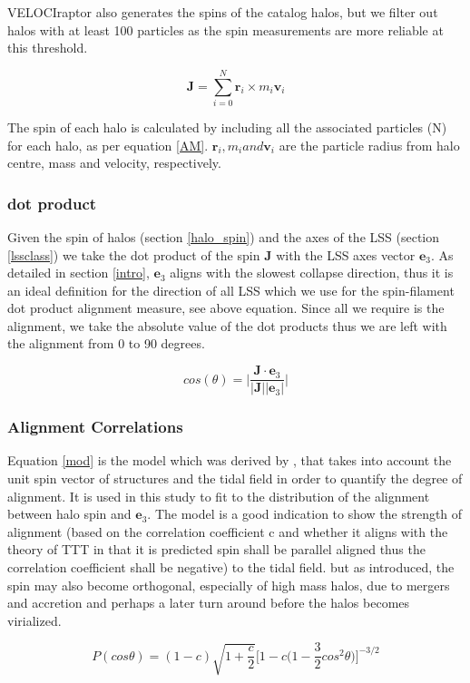 \documentclass[a4paper,fleqn,usenatbib]{mnras}
\begin{document}
VELOCIraptor also generates the spins of the catalog halos, but we filter out halos with at least 100 particles as the spin measurements are more reliable at this threshold. 
\begin{ceqn}
\begin{equation}
\textbf{J}=\sum_{i=0}^{N}\textbf{r}_i\times m_i\textbf{v}_i \label{AM}
\end{equation}
\end{ceqn}

The spin of each halo is calculated by including all the associated particles (N) for each halo, as per equation \ref{AM}. $\textbf{r}_i,m_i and \textbf{v}_i$ are the particle radius from halo centre, mass and velocity, respectively.

\subsubsection{dot product}

Given the spin of halos (section \ref{halo_spin}) and the axes of the LSS (section \ref{lssclass}) we take the dot product of the spin \textbf{J} with the LSS axes vector $\textbf{e}_{3}$. As detailed in section \ref{intro}, $\textbf{e}_{3}$ aligns with the slowest collapse direction, thus it is an ideal definition for the direction of all LSS which we use for the spin-filament dot product alignment measure, see above equation.
Since all we require is the alignment, we take the absolute value of the dot products thus we are left with the alignment from 0 to 90 degrees. 
\begin{ceqn}
\begin{equation}
cos(\theta)=\bigg|\frac{\textbf{J}\cdot \textbf{e}_{3}}{|\textbf{J}| |\textbf{e}_{3}|}\bigg|\label{dotprod}
\end{equation}
\end{ceqn}

\subsubsection{Alignment Correlations} 

Equation \ref{mod} is the model which was derived by \citet{Lee_11}, that takes into account the unit spin vector of structures and the tidal field in order to quantify the degree of alignment. It is used in this study to fit to the distribution of the alignment between halo spin and $\textbf{e}_{3}$. The model is a good indication to show the strength of alignment (based on the correlation coefficient c and whether it aligns with the theory of TTT in that it is predicted spin shall be parallel aligned thus the correlation coefficient shall be negative) to the tidal field. but as introduced, the spin may also become orthogonal, especially of high mass halos, due to mergers and accretion and perhaps a later turn around before the halos becomes virialized.
\begin{ceqn}
\begin{equation}
\textit{P}(cos\theta)=(1-c)\sqrt{1+\frac{c}{2}}\Big[1-c\Big(1-\frac{3}{2}cos^{2}\theta\Big)\Big]^{-3/2} \label{mod}
\end{equation}
\end{ceqn}
\end{document}
